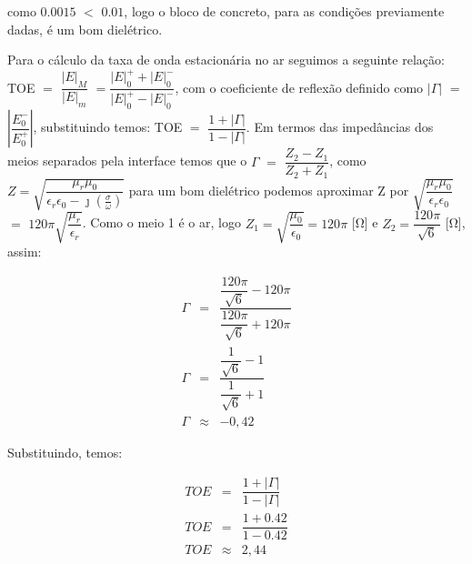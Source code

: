 \begin{enumerate}[1.]
como $0.0015$ $<$ $0.01$, logo o bloco de concreto, para as condições previamente dadas, é um bom dielétrico.

Para o cálculo da taxa de onda estacionária no ar seguimos a seguinte relação: TOE $=$ $\dfrac{|E|_{M}}{|E|_{m}}$ $=$$\dfrac{|E|^{+}_{0} + |E|^{-}_{0}}{|E|^{+}_{0} - |E|^{-}_{0}}$, com o coeficiente de reflexão definido como $|\Gamma|$ $=$ $\left|\dfrac{E^{-}_{0}}{E^{+}_{0}}\right|$, substituindo temos: TOE $=$ $\dfrac{1 + |\Gamma|}{1 - |\Gamma|}$. Em termos das impedâncias dos meios separados pela interface temos que o $\Gamma$ $=$ $\dfrac{Z_{2} - Z_{1}}{Z_{2} + Z_{1}}$, como $Z = \sqrt{\dfrac{\mu_{r}\mu_{0}}{\epsilon_{r}\epsilon_{0} - \jmath \left(\frac{\sigma}{\omega}\right)}}$  para um bom dielétrico podemos aproximar Z por $\sqrt{\dfrac{\mu_{r}\mu_{0}}{\epsilon_{r}\epsilon_{0}}}$ $=$ $120\pi \sqrt{\dfrac{\mu_{r}}{\epsilon_{r}}}$.  Como o meio 1 é o ar, logo $Z_{1} = \sqrt{\dfrac{\mu_{0}}{\epsilon_{0}}} =120\pi$ [\si{\ohm}] e $Z_{2} = \dfrac{120\pi}{\sqrt{6}}$ [\si{\ohm}], assim:

\begin{eqnarray*}
  \Gamma & = & \dfrac{\dfrac{120\pi}{\sqrt{6}} - 120\pi}{\dfrac{120\pi}{\sqrt{6}} + 120\pi} \nonumber \\
  \Gamma & = &\dfrac{\dfrac{1}{\sqrt{6}} - 1}{\dfrac{1}{\sqrt{6}} + 1} \nonumber \\
  \Gamma & \approx & -0,42 \nonumber
\end{eqnarray*}

Substituindo, temos:

\begin{eqnarray*}
  TOE & = & \dfrac{1 + |\Gamma|}{1 - |\Gamma|} \nonumber \\
  TOE & = & \dfrac{1 + 0.42}{1 - 0.42} \nonumber \\
  TOE & \approx & 2,44
\end{eqnarray*}


\end{enumerate}
